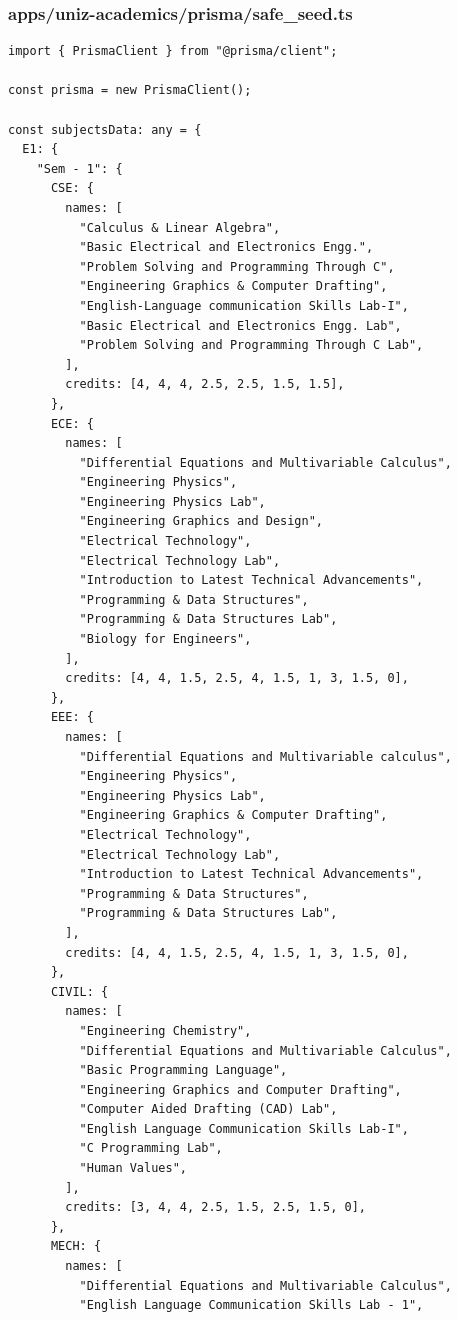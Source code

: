 \documentclass[11pt,a4paper,oneside]{article}
\begin{document}
\subsubsection*{apps/uniz-academics/prisma/safe\_seed.ts}
\begin{lstlisting}
import { PrismaClient } from "@prisma/client";

const prisma = new PrismaClient();

const subjectsData: any = {
  E1: {
    "Sem - 1": {
      CSE: {
        names: [
          "Calculus & Linear Algebra",
          "Basic Electrical and Electronics Engg.",
          "Problem Solving and Programming Through C",
          "Engineering Graphics & Computer Drafting",
          "English-Language communication Skills Lab-I",
          "Basic Electrical and Electronics Engg. Lab",
          "Problem Solving and Programming Through C Lab",
        ],
        credits: [4, 4, 4, 2.5, 2.5, 1.5, 1.5],
      },
      ECE: {
        names: [
          "Differential Equations and Multivariable Calculus",
          "Engineering Physics",
          "Engineering Physics Lab",
          "Engineering Graphics and Design",
          "Electrical Technology",
          "Electrical Technology Lab",
          "Introduction to Latest Technical Advancements",
          "Programming & Data Structures",
          "Programming & Data Structures Lab",
          "Biology for Engineers",
        ],
        credits: [4, 4, 1.5, 2.5, 4, 1.5, 1, 3, 1.5, 0],
      },
      EEE: {
        names: [
          "Differential Equations and Multivariable calculus",
          "Engineering Physics",
          "Engineering Physics Lab",
          "Engineering Graphics & Computer Drafting",
          "Electrical Technology",
          "Electrical Technology Lab",
          "Introduction to Latest Technical Advancements",
          "Programming & Data Structures",
          "Programming & Data Structures Lab",
        ],
        credits: [4, 4, 1.5, 2.5, 4, 1.5, 1, 3, 1.5, 0],
      },
      CIVIL: {
        names: [
          "Engineering Chemistry",
          "Differential Equations and Multivariable Calculus",
          "Basic Programming Language",
          "Engineering Graphics and Computer Drafting",
          "Computer Aided Drafting (CAD) Lab",
          "English Language Communication Skills Lab-I",
          "C Programming Lab",
          "Human Values",
        ],
        credits: [3, 4, 4, 2.5, 1.5, 2.5, 1.5, 0],
      },
      MECH: {
        names: [
          "Differential Equations and Multivariable Calculus",
          "English Language Communication Skills Lab - 1",

\end{lstlisting}
\end{document}
